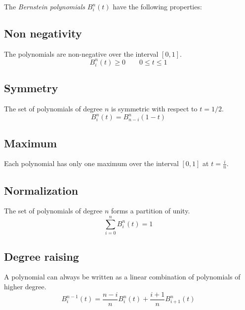 \documentclass[12pt]{article}
\begin{document}
The \emph{Bernstein polynomials} $B_i^n(t)$ have the following properties:

\subsection{Non negativity}
The polynomials are non-negative over the interval $[0, 1]$.
$$B_i^n(t)\ge 0 \quad\quad 0\le t\le 1$$

\subsection{Symmetry}
The set of polynomials of degree $n$ is symmetric with respect to $t=1/2$.
$$B_i^n(t)=B_{n-i}^n(1-t)$$

\subsection{Maximum}
Each polynomial has only one maximum over the interval $[0,1]$ at $t=\frac{i}{n}$.

\subsection{Normalization}
The set of polynomials of degree $n$ forms a partition of unity.
$$\sum_{i=0}^{n} B_i^n(t)=1$$

\subsection{Degree raising}
A polynomial can always be written as a linear combination of polynomials of higher degree.
$$B_i^{n-1}(t)=\frac{n-i}{n}B_i^n(t)+\frac{i+1}{n}B_{i+1}^n(t)$$
\end{document}
